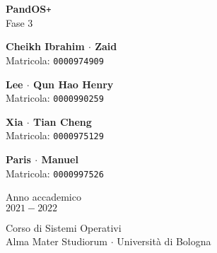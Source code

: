 \documentclass[11pt]{article}
\begin{document}
\graphicspath{ {./img/} }
\begin{titlepage}
    \begin{center}
        \vspace*{1.5cm}
            
        \Huge
        \textbf{PandOS}\texttt{+} \\
        \LARGE
        Fase 3
                        
        \vspace{2.0cm}
          
        \begin{minipage}[t]{0.47\textwidth}
        \begin{center}
        	{\large{\bf Cheikh Ibrahim $\cdot$ Zaid}}\\
			{\large Matricola: \texttt{0000974909}}
        \end{center}

		\end{minipage}
		\hfill
		\begin{minipage}[t]{0.47\textwidth}\raggedleft
		\begin{center}
        	{\large{\bf Lee $\cdot$ Qun Hao Henry}}\\
			{\large Matricola: \texttt{0000990259}}
        \end{center}
		\end{minipage}

        \vspace{1cm}

        \begin{minipage}[t]{0.47\textwidth}
            \begin{center}
                {\large{\bf Xia $\cdot$ Tian Cheng}}\\
                {\large Matricola: \texttt{0000975129}}
            \end{center}
    
            \end{minipage}
            \hfill
            \begin{minipage}[t]{0.47\textwidth}\raggedleft
            \begin{center}
                {\large{\bf Paris $\cdot$ Manuel}}\\
                {\large Matricola: \texttt{0000997526}}
            \end{center}
            \end{minipage}  
            
        \vspace{6cm}
            
        Anno	 accademico\\
        $2021 - 2022$
            
        \vspace{0.8cm}
            
            
        \Large
        Corso di Sistemi Operativi\\
        Alma Mater Studiorum $\cdot$ Università di Bologna\\
            
    \end{center}
\end{titlepage}
\pagebreak
\end{document}

